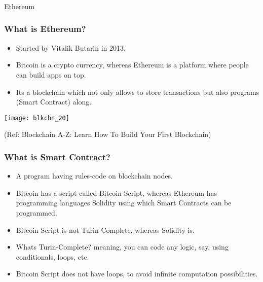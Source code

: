 \begin{frame}[fragile]\frametitle{}
\begin{center}
{\Large Ethereum}
\end{center}
\end{frame}

\begin{frame}[fragile]\frametitle{What is Ethereum?}
\begin{itemize}
\item Started by Vitalik Butarin in 2013.
\item Bitcoin is a crypto currency, whereas Ethereum is a platform where people can build apps on top.
\item Its a blockchain which not only allows to store transactions but also programs (Smart Contract) along.
\end{itemize}

\begin{center}
\texttt{[image: blkchn\_20]}

{\tiny (Ref: Blockchain A-Z: Learn How To Build Your First Blockchain)}
\end{center}

\end{frame}

\begin{frame}[fragile]\frametitle{What is Smart Contract?}
\begin{itemize}
\item A program having rules-code on blockchain nodes.
\item Bitcoin has a script called Bitcoin Script, whereas Ethereum has programming languages Solidity using which Smart Contracts can be programmed.
\item Bitcoin Script is not Turin-Complete, whereas Solidity is.
\item Whats Turin-Complete? meaning, you can code any logic, say, using conditionals, loops, etc. 
\item Bitcoin Script does not have loops, to avoid infinite computation possibilities.
\end{itemize}


\end{frame}


